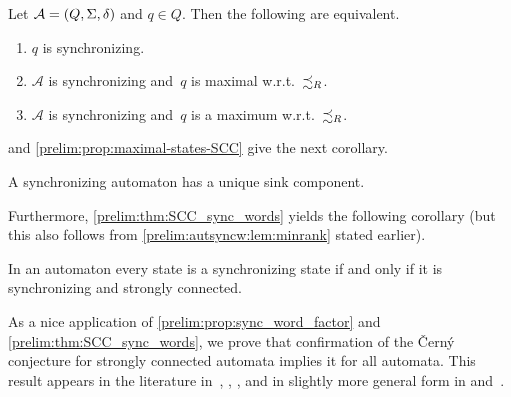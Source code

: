 \begin{corollary} \label{prelim:classes:sync:cor:sync-state}
	Let $\mathcal A = (Q, \Sigma, \delta)$ and $q \in Q$.
	Then the following are equivalent.
	\begin{enumerate}
	\item $q$ is synchronizing.
	
	\item $\mathcal A$ is synchronizing and~$q$ is maximal w.r.t.~$\precsim_R$.
	
	\item $\mathcal A$ is synchronizing and~$q$ is a maximum w.r.t.~$\precsim_R$.
		
	\end{enumerate}
\end{corollary}

and \cref{prelim:prop:maximal-states-SCC} give the next corollary.

\begin{corollary}\label{prelim:cor:sync-unique-sink}
	A synchronizing automaton has a unique sink component.
\end{corollary} 

Furthermore, \cref{prelim:thm:SCC_sync_words}
yields the following corollary (but this also follows from \cref{prelim:autsyncw:lem:minrank} stated earlier).
 
\begin{corollary}
	\label{prelim:cor:SCC_sync}
	In an automaton every state is a synchronizing state if and only if it is synchronizing and strongly connected.
\end{corollary} 

As a nice application of \cref{prelim:prop:sync_word_factor} and \cref{prelim:thm:SCC_sync_words}, 
we prove that confirmation of
the \v{C}ern\'y conjecture for strongly connected automata
implies it for all automata.
This result appears in the literature in~\cite[Thm.~10]{Pin81a}, \cite[Prop.~2]{DBLP:journals/acta/CarpiD09}, \cite[Thm.~2]{Rystsov92}, and in slightly more general form in
\cite[Prop.~2.1]{DBLP:journals/tcs/Volkov09} and~\cite[Thm.~6]{DBLP:conf/birthday/Babcsanyi09}.


